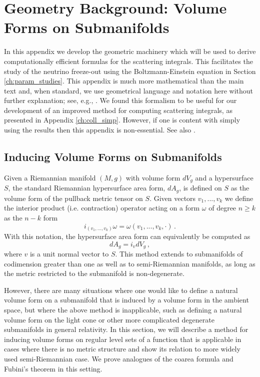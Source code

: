 \section{Geometry Background: Volume Forms on Submanifolds}\label{ch:vol_forms}
In this appendix we develop the geometric machinery which will be used to derive computationally efficient formulas for the scattering integrals. This facilitates the study  of the neutrino freeze-out using the Boltzmann-Einstein equation in Section \ref{ch:param_studies}.  This appendix is much more mathematical than the main text and, when standard, we use geometrical language and notation here without further explanation;  see, e.g., \cite{lee2003introduction,lee1997riemannian,o1983semi}.  We found this formalism to be useful for our development of an improved method for computing scattering integrals, as presented in Appendix \ref{ch:coll_simp}.  However, if one is content with simply using the results then this appendix is non-essential. See also   \cite{Birrell:2014uka}.



\subsection{Inducing Volume Forms on Submanifolds}

Given a Riemannian manifold $(M,g)$ with volume form $dV_g$ and a  hypersurface $S$, the standard Riemannian hypersurface area form, $dA_g$, is defined on $S$ as the volume form of the pullback metric tensor on $S$.   Given vectors $v_1,...,v_k$ we define the interior product (i.e. contraction)  operator acting on a form $\omega$ of degree $n\geq k$ as the $n-k$ form 
\begin{equation}
i_{(v_1,...,v_k)}\omega=\omega(v_1,...,v_k,\cdot)\,.
\end{equation}
 With this notation, the hypersurface area form can equivalently be computed as
\begin{equation}
dA_g=i_v dV_g\,,
\end{equation}
where $v$ is a unit normal vector to $S$.  This method extends to submanifolds of codimension greater than one as well as to semi-Riemannian manifolds, as long as the metric restricted to the submanifold is non-degenerate. 

However, there are many situations where one would like to define a natural volume form on a submanifold that is induced by a volume form in the ambient space, but where the above method is inapplicable, such as defining a natural volume form on the light cone or other more complicated degenerate submanifolds in general relativity. In this section, we will describe a method for inducing volume forms on regular level sets of a function that is applicable in cases where there is no metric structure and show its relation to more widely used semi-Riemannian case.  We prove analogues of the coarea formula and Fubini's theorem in this setting. 

